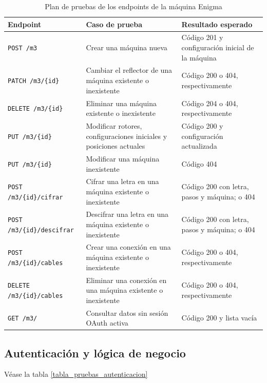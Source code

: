 \begin{table}[htbp]
	\centering
	\footnotesize
	\begin{tabular}{|p{4cm}|p{5cm}|p{3cm}|}
		\hline
		\textbf{Endpoint} & \textbf{Caso de prueba} & \textbf{Resultado esperado} \\
		\hline
		\texttt{POST /m3} & Crear una máquina nueva & Código 201 y configuración inicial de la máquina \\
		\hline
		\texttt{PATCH /m3/\{id\}} & Cambiar el reflector de una máquina existente o inexistente & Código 200 o 404, respectivamente \\
		\hline
		\texttt{DELETE /m3/\{id\}} & Eliminar una máquina existente o inexistente & Código 204 o 404, respectivamente \\
		\hline
		\texttt{PUT /m3/\{id\}} & Modificar rotores, configuraciones iniciales y posiciones actuales & Código 200 y configuración actualizada \\
		\hline
		\texttt{PUT /m3/\{id\}} & Modificar una máquina inexistente & Código 404 \\
		\hline
		\texttt{POST /m3/\{id\}/cifrar} & Cifrar una letra en una máquina existente o inexistente & Código 200 con letra, pasos y máquina; o 404 \\
		\hline
		\texttt{POST /m3/\{id\}/descifrar} & Descifrar una letra en una máquina existente o inexistente & Código 200 con letra, pasos y máquina; o 404 \\
		\hline
		\texttt{POST /m3/\{id\}/cables} & Crear una conexión en una máquina existente o inexistente & Código 200 o 404, respectivamente \\
		\hline
		\texttt{DELETE /m3/\{id\}/cables} & Eliminar una conexión en una máquina existente o inexistente & Código 200 o 404, respectivamente \\
		\hline
		\texttt{GET /m3/} & Consultar datos sin sesión OAuth activa & Código 200 y lista vacía \\
		\hline
	\end{tabular}
	\caption{Plan de pruebas de los endpoints de la máquina Enigma}
	\label{tabla_pruebas_m3}
\end{table}

\subsection{Autenticación y lógica de negocio}

Véase la tabla \ref{tabla_pruebas_autenticacion}

